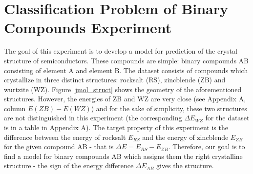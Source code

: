\documentclass[11pt,oneside,czech,american]{book} %
\theoremstyle{definition} %
\theoremstyle{definition}
\begin{document}
\chapter{Classification Problem of Binary Compounds Experiment}
The goal of this experiment is to develop a model for prediction of the crystal structure of semiconductors. These compounds are simple: binary compounds AB consisting of element A and element B. The dataset consists of compounds which crystallize in three distinct structures: rocksalt (RS), zincblende (ZB) and wurtzite (WZ). Figure \ref{jmol_struct} shows the geometry of the aforementioned structures. However, the energies of ZB and WZ are very close (see Appendix A, column $E(ZB) - E(WZ)$) and for the sake of simplicity, these two structures are not distinguished in this experiment (the corresponding $\Delta E_{WZ}$ for the dataset is in a table in Appendix A). The target property of this experiment is the difference between the energy of rocksalt $E_{RS}$ and the energy of zincblende $E_{ZB}$ for the given compound AB - that is $\Delta E = E_{RS} - E_{ZB}$. Therefore, our goal is to find a model for binary compounds AB which assigns them the right crystalline structure - the sign of the energy difference $\Delta E_{AB}$ gives the structure.
\end{document}
